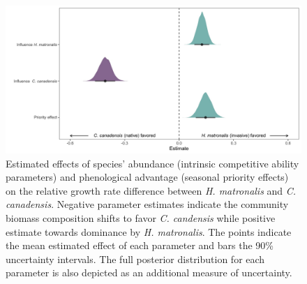 \documentclass{article}[11pt]
\begin{document}
{\begin{figure}[h!]
    \centering
\includegraphics[width=\textwidth]{..//figure/mu_plots.jpeg}
    \caption{Estimated effects of species' abundance (intrinsic competitive ability parameters) and phenological advantage (seasonal priority effects) on the relative growth rate difference between \textit{H. matronalis} and \textit{C. canadensis}. Negative parameter estimates indicate the community biomass composition shifts to favor \textit{C. candensis} while positive estimate towards dominance by \textit{ H. matronalis}. The points indicate the mean estimated effect of each parameter and bars the 90\% uncertainty intervals. The full posterior distribution for each parameter is also depicted as an additional measure of uncertainty.} 
    \label{fig:RGRD}
\end{figure}


}
\end{document}
